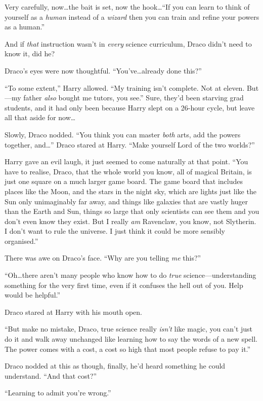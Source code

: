 Very carefully, now…the bait is set, now the hook…“If you can learn to think of yourself as a \emph{human} instead of a \emph{wizard} then you can train and refine your powers as a human.”

And if \emph{that} instruction wasn’t in \emph{every} science curriculum, Draco didn’t need to know it, did he?

Draco’s eyes were now thoughtful. “You’ve…already done this?”

“To some extent,” Harry allowed. “My training isn’t complete. Not at eleven. But—my father \emph{also} bought me tutors, you see.” Sure, they’d been starving grad students, and it had only been because Harry slept on a 26-hour cycle, but leave all that aside for now…

Slowly, Draco nodded. “You think you can master \emph{both} arts, add the powers together, and…” Draco stared at Harry. “Make yourself Lord of the two worlds?”

Harry gave an evil laugh, it just seemed to come naturally at that point. “You have to realise, Draco, that the whole world you know, all of magical Britain, is just one square on a much larger game board. The game board that includes places like the Moon, and the stars in the night sky, which are lights just like the Sun only unimaginably far away, and things like galaxies that are vastly huger than the Earth and Sun, things so large that only scientists can see them and you don’t even know they exist. But I really \emph{am} Ravenclaw, you know, not Slytherin. I don’t want to rule the universe. I just think it could be more sensibly organised.”

There was awe on Draco’s face. “Why are you telling \emph{me} this?”

“Oh…there aren’t many people who know how to do \emph{true} science—understanding something for the very first time, even if it confuses the hell out of you. Help would be helpful.”

Draco stared at Harry with his mouth open.

“But make no mistake, Draco, true science really \emph{isn’t} like magic, you can’t just do it and walk away unchanged like learning how to say the words of a new spell. The power comes with a cost, a cost so high that most people refuse to pay it.”

Draco nodded at this as though, finally, he’d heard something he could understand. “And that cost?”

“Learning to admit you’re wrong.”

